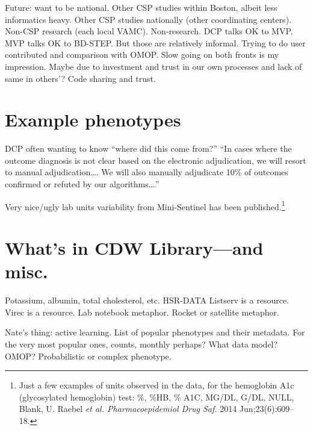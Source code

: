 \documentclass{tufte-handout}
\begin{document}
Future: want to be national. Other CSP studies within Boston, albeit
less informatics heavy. Other CSP studies nationally (other
coordinating centers). Non-CSP research (each local VAMC).
Non-research. DCP talks OK to MVP. MVP talks OK to BD-STEP. But those
are relatively informal. Trying to do user contributed and comparison
with OMOP. Slow going on both fronts is my impression. Maybe due to
investment and trust in our own processes and lack of same in others'?
Code sharing and trust. 


\section{Example phenotypes}

DCP often wanting
to know ``where did this come from?''  ``In cases where the outcome
diagnosis is not clear based on the electronic adjudication, we will
resort to manual adjudication\ldots{}. We will also manually adjudicate
10\% of outcomes confirmed or refuted by our algorithms\ldots{}.''

Very nice/ugly lab units variability from Mini-Sentinel has been
published.\footnote{Just a few examples of units observed in the data,
  for the hemoglobin A1c (glycosylated hemoglobin) test: \%, \%HB, \%
  A1C, MG/DL, G/DL, NULL, Blank, U. Raebel \emph{et al.
    Pharmacoepidemiol Drug Saf.} 2014 Jun;23(6):609--18.}

\section{What's in CDW Library---and misc.}

Potassium, albumin, total cholesterol, etc. HSR-DATA Listserv is a
resource. Virec is a resource. Lab notebook metaphor. Rocket or
satellite metaphor.

Nate's thing: active learning. List of popular phenotypes and their
metadata. For the very most popular ones, counts, monthly perhaps?
What data model? OMOP? Probabilistic or complex phenotype.
\end{document}

